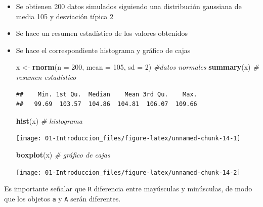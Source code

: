 \documentclass[]{book}
\newenvironment{Shaded}{\begin{snugshade}}{\end{snugshade}}
\newcommand{\CommentTok}[1]{\textcolor[rgb]{0.56,0.35,0.01}{\textit{#1}}}
\newcommand{\DataTypeTok}[1]{\textcolor[rgb]{0.13,0.29,0.53}{#1}}
\newcommand{\DecValTok}[1]{\textcolor[rgb]{0.00,0.00,0.81}{#1}}
\newcommand{\KeywordTok}[1]{\textcolor[rgb]{0.13,0.29,0.53}{\textbf{#1}}}
\newcommand{\NormalTok}[1]{#1}
\newcommand{\StringTok}[1]{\textcolor[rgb]{0.31,0.60,0.02}{#1}}
\begin{document}
\begin{itemize}
\item
  Se obtienen 200 datos simulados siguiendo una distribución gaussiana
  de media 105 y desviación típica 2
\item
  Se hace un resumen estadístico de los valores obtenidos
\item
  Se hace el correspondiente histograma y gráfico de cajas

\begin{Shaded}
\begin{Highlighting}[]
\NormalTok{x <-}\StringTok{ }\KeywordTok{rnorm}\NormalTok{(}\DataTypeTok{n =} \DecValTok{200}\NormalTok{, }\DataTypeTok{mean =} \DecValTok{105}\NormalTok{, }\DataTypeTok{sd =} \DecValTok{2}\NormalTok{) }\CommentTok{#datos normales}
\KeywordTok{summary}\NormalTok{(x) }\CommentTok{# resumen estadístico}
\end{Highlighting}
\end{Shaded}

\begin{verbatim}
##    Min. 1st Qu.  Median    Mean 3rd Qu.    Max. 
##   99.69  103.57  104.86  104.81  106.07  109.66
\end{verbatim}

\begin{Shaded}
\begin{Highlighting}[]
\KeywordTok{hist}\NormalTok{(x) }\CommentTok{# histograma}
\end{Highlighting}
\end{Shaded}

  \begin{center}\texttt{[image: 01-Introduccion\_files/figure-latex/unnamed-chunk-14-1]} \end{center}

\begin{Shaded}
\begin{Highlighting}[]
\KeywordTok{boxplot}\NormalTok{(x) }\CommentTok{# gráfico de cajas}
\end{Highlighting}
\end{Shaded}

  \begin{center}\texttt{[image: 01-Introduccion\_files/figure-latex/unnamed-chunk-14-2]} \end{center}
\end{itemize}

Es importante señalar que \texttt{R} diferencia entre mayúsculas y
minúsculas, de modo que los objetos \texttt{a} y \texttt{A} serán diferentes.
\end{document}
